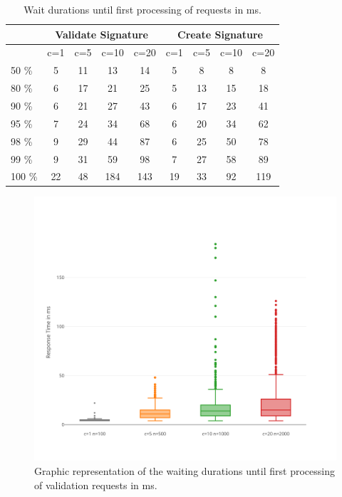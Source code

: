 \documentclass[a4paper,12pt]{scrartcl}
\begin{document}
\begin{table}[H]
    \centering
    \label{tab:TableWaitDurations}
    \begin{tabular}{|l|c|c|c|c|c|c|c|c|}
        \hline
        & \multicolumn{4}{|c|}{Validate Signature} & \multicolumn{4}{|c|}{Create Signature}\\
        \hline
        &   c=1   & c=5 &   c=10 & c=20 &   c=1   & c=5 &   c=10 & c=20\\
        \hline
        50 \%   &   5     &   11 &   13 &   14 &   5 &   8 &   8 &   8\\
        \hline
        80 \%   &   6     &   17 &   21 &   25 &   5 &   13 &   15 &   18\\
        \hline
        90 \%   &   6     &   21 &   27 &   43 &   6 &   17 &   23 &   41\\
        \hline
        95 \%   &   7     &   24 &   34 &   68 &   6 &   20 &   34 &   62\\
        \hline
        98 \%   &   9     &   29 &   44 &   87 &   6 &   25 &   50 &   78\\
        \hline
        99 \%   &   9     &   31 &   59 &   98 &  7 &   27 &   58 &   89\\
        \hline
        100 \%  &   22     &   48 &   184 &   143 & 19 &  33 &  92 &  119\\
        \hline
    \end{tabular}
    \caption{Wait durations until first processing of requests in ms.}
\end{table}

\begin{figure}[H]
\centering
\includegraphics[width=350pt]{Images/ValidateRequestWaitDurationsDiagram.png}
\caption{Graphic representation of the waiting durations until first processing of validation requests in ms.}
\label{fig:ValidateRequestWaitDurationsDiagram}
\end{figure}
\end{document}
